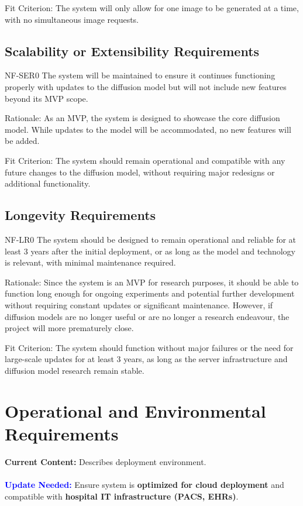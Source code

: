 \documentclass[12pt]{article}
\begin{document}
Fit Criterion: The system will only allow for one image to be generated at a time, with no 
simultaneous image requests.

\subsection{Scalability or Extensibility Requirements}
NF-SER0 The system will be maintained to ensure it continues functioning properly with updates to 
the diffusion model but will not include new features beyond its MVP scope.

Rationale: As an MVP, the system is designed to showcase the core diffusion model. While updates
 to the model will be accommodated, no new features will be added.

Fit Criterion: The system should remain operational and compatible with any future changes to the
 diffusion model, without requiring major redesigns or additional functionality.

\subsection{Longevity Requirements}
NF-LR0 The system should be designed to remain operational and reliable for at least 3 years after 
the initial deployment, or as long as the model and technology is relevant, with minimal 
maintenance required.

Rationale: Since the system is an MVP for research purposes, it should be able to function long 
enough for ongoing experiments and potential further development without requiring constant 
updates or significant maintenance. However, if diffusion models are no longer useful or are no 
longer a research endeavour, the project will more prematurely close.

Fit Criterion: The system should function without major failures or the need for large-scale 
updates for at least 3 years, as long as the server infrastructure and diffusion model research 
remain stable.


\section{Operational and Environmental Requirements}

\textbf{Current Content:} Describes deployment environment. \\
\\
\textbf{\textcolor{blue}{Update Needed:}} Ensure system is \textbf{optimized for cloud deployment} and compatible with \textbf{hospital IT infrastructure (PACS, EHRs)}.
\end{document}
